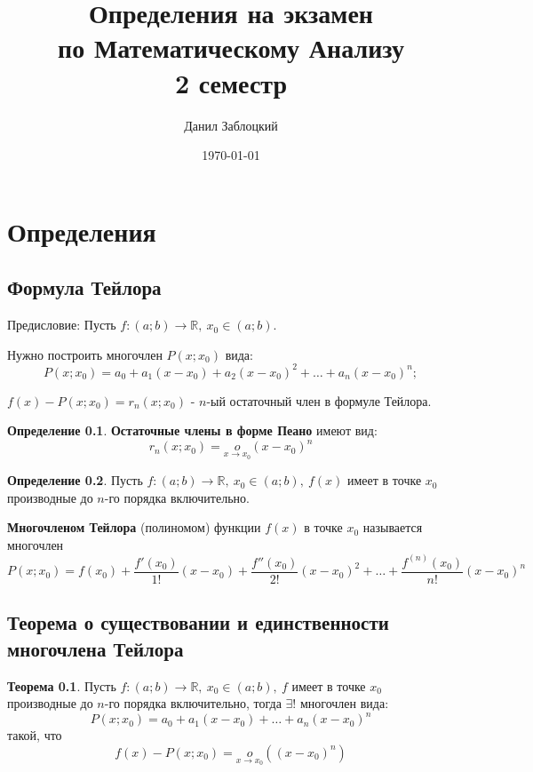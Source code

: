 \documentclass{report}
\title{Определения на экзамен \\ по Математическому Анализу \\ 2 семестр}
\author{Данил Заблоцкий}
\date{\today}
\theoremstyle{definition}
\newtheorem*{definition}{Определение}
\newtheorem*{theorem}{Теорема}
\begin{document}
\maketitle
\tableofcontents
\chapter*{Определения}

\section{Формула Тейлора}

Предисловие: Пусть $f:(a;b)\rightarrow\mathbb{R}, \ x_0 \in (a;b)$.

Нужно построить многочлен $P(x;x_0)$ вида:
\begin{equation*}
    P(x;x_0) = a_0 + a_1(x - x_0) + a_2(x - x_0)^2 + \ldots + a_n(x - x_0)^n;
\end{equation*}

$f(x) - P(x;x_0) = r_n(x;x_0)$ - $n$-ый остаточный член в формуле Тейлора.

\begin{definition}
    \textbf{Остаточные члены в форме Пеано} имеют вид:
    \begin{equation*}
        r_n(x;x_0) = \underset{x\rightarrow x_0}{o}(x-x_0)^n
    \end{equation*}
\end{definition}

\begin{definition}
    Пусть $f:(a;b)\rightarrow\mathbb{R}, \ x_0 \in (a;b), \ f(x)$ имеет в точке $x_0$ производные
    до $n$-го порядка включительно.

    \textbf{Многочленом Тейлора} (полиномом) функции $f(x)$ в точке $x_0$ называется многочлен
    \begin{equation*}
        P(x;x_0) = f(x_0) + \frac{f'(x_0)}{1!}(x-x_0) + \frac{f''(x_0)}{2!}(x-x_0)^2 + \ldots +
        \frac{f^{(n)}(x_0)}{n!}(x-x_0)^n
    \end{equation*}
\end{definition}

\section{Теорема о существовании и единственности многочлена Тейлора}

\begin{theorem}
    Пусть $f:(a;b)\rightarrow\mathbb{R}, \ x_0\in(a;b), \ f$ имеет в точке $x_0$ производные
    до $n$-го порядка включительно, тогда $\exists !$ многочлен вида:
    \begin{equation*}
        P(x;x_0) = a_0 + a_1(x-x_0) + \ldots + a_n(x-x_0)^n
    \end{equation*}
    такой, что
    \begin{equation*}
        f(x) - P(x;x_0) = \underset{x\rightarrow x_0}{o}((x-x_0)^n)
    \end{equation*}
\end{theorem}
\end{document}
